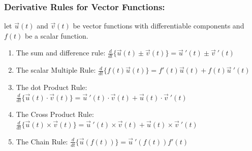 \documentclass[14pt]{article}
\begin{document}
    \subsubsection{Derivative Rules for Vector Functions:}
    let $\vec u(t)$ and $\vec v (t)$ be vector functions with
    differentiable components and $f(t)$ be a scalar function.\\
    \begin{enumerate}
        \item The sum and difference rule: $\frac{d}{dt}\bigg\{\vec
        u(t)\pm \vec v(t)\bigg\}=\vec u\ '(t)\pm\vec v\ '(t)$
        \item The scalar Multiple Rule: $\frac{d}{dt}\bigg\{f(t)\vec
        u(t)\bigg\}=f'(t)\vec u(t)+f(t)\vec u\ '(t)$
        \item The dot Product Rule: $\frac{d}{dt}\bigg\{\vec u(t)\cdot
        \vec v(t)\bigg\}=\vec u\ '(t)\cdot \vec v(t)+\vec u(t)\cdot \vec
        v\ '(t)$
        \item The Cross Product Rule: $\frac{d}{dt}\bigg\{\vec
        u(t)\times \vec v(t)\bigg\}=\vec u\ '(t)\times \vec v(t)+\vec
        u(t)\times \vec v\ '(t)$
        \item The Chain Rule: $\frac{d}{dt}\bigg\{\vec
        u(f(t))\bigg\}=\vec u\ '(f(t))f'(t)$
    \end{enumerate}
\end{document}
